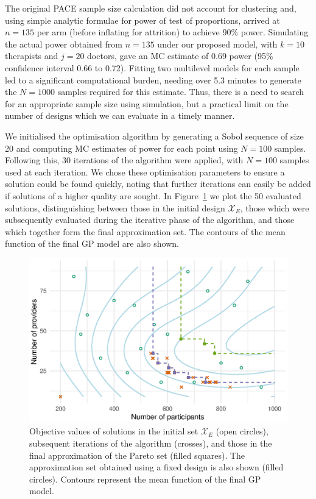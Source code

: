 \documentclass[sagev]{sagej}
\begin{document}
The original PACE sample size calculation did not account for clustering and, using simple analytic formulae for power of test of proportions, arrived at $n = 135$ per arm (before inflating for attrition) to achieve 90\% power. Simulating the actual power obtained from $n=135$ under our proposed model, with $k = 10$ therapists and $j = 20$ doctors, gave an MC estimate of 0.69 power (95\% confidence interval 0.66 to 0.72). Fitting two multilevel models for each sample led to a significant computational burden, needing over 5.3 minutes to generate the $N=1000$ samples required for this estimate. Thus, there is a need to search for an appropriate sample size using simulation, but a practical limit on the number of designs which we can evaluate in a timely manner. 

We initialised the optimisation algorithm by generating a Sobol sequence of size 20 and computing MC estimates of power for each point using $N = 100$ samples. Following this, 30 iterations of the algorithm were applied, with $N = 100$ samples used at each iteration. We chose these optimisation parameters to ensure a solution could be found quickly, noting that further iterations can easily be added if solutions of a higher quality are sought. In Figure~\ref{fig:ex1_single_run} we plot the 50 evaluated solutions, distinguishing between those in the initial design $\mathcal{X}_{E}$, those which were subsequently evaluated during the iterative phase of the algorithm, and those which together form the final approximation set. The contours of the mean function of the final GP model are also shown. 

\begin{figure}
\centering
\includegraphics[scale=0.8]{./figures/ex1_single_run.eps}
\caption{Objective values of solutions in the initial set $\mathcal{X}_{E}$ (open circles), subsequent iterations of the algorithm (crosses), and those in the final approximation of the Pareto set (filled squares). The approximation set obtained using a fixed design is also shown (filled circles). Contours represent the mean function of the final GP model.}
\label{fig:ex1_single_run}
\end{figure}
\end{document}
